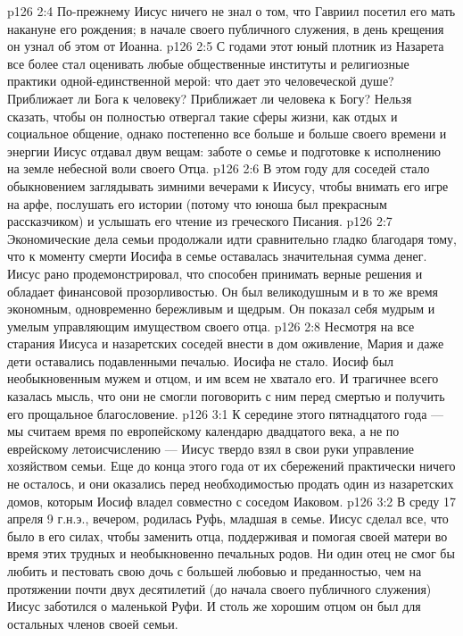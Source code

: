 \vs p126 2:4 По\hyp{}прежнему Иисус ничего не знал о том, что Гавриил посетил его мать накануне его рождения; в начале своего публичного служения, в день крещения он узнал об этом от Иоанна.
\vs p126 2:5 \pc С годами этот юный плотник из Назарета все более стал оценивать любые общественные институты и религиозные практики одной\hyp{}единственной мерой: что дает это человеческой душе? Приближает ли Бога к человеку? Приближает ли человека к Богу? Нельзя сказать, чтобы он полностью отвергал такие сферы жизни, как отдых и социальное общение, однако постепенно все больше и больше своего времени и энергии Иисус отдавал двум вещам: заботе о семье и подготовке к исполнению на земле небесной воли своего Отца.
\vs p126 2:6 \pc В этом году для соседей стало обыкновением заглядывать зимними вечерами к Иисусу, чтобы внимать его игре на арфе, послушать его истории (потому что юноша был прекрасным рассказчиком) и услышать его чтение из греческого Писания.
\vs p126 2:7 Экономические дела семьи продолжали идти сравнительно гладко благодаря тому, что к моменту смерти Иосифа в семье оставалась значительная сумма денег. Иисус рано продемонстрировал, что способен принимать верные решения и обладает финансовой прозорливостью. Он был великодушным и в то же время экономным, одновременно бережливым и щедрым. Он показал себя мудрым и умелым управляющим имуществом своего отца.
\vs p126 2:8 Несмотря на все старания Иисуса и назаретских соседей внести в дом оживление, Мария и даже дети оставались подавленными печалью. Иосифа не стало. Иосиф был необыкновенным мужем и отцом, и им всем не хватало его. И трагичнее всего казалась мысль, что они не смогли поговорить с ним перед смертью и получить его прощальное благословение.
\vs p126 3:1 К середине этого пятнадцатого года --- мы считаем время по европейскому календарю двадцатого века, а не по еврейскому летоисчислению --- Иисус твердо взял в свои руки управление хозяйством семьи. Еще до конца этого года от их сбережений практически ничего не осталось, и они оказались перед необходимостью продать один из назаретских домов, которым Иосиф владел совместно с соседом Иаковом.
\vs p126 3:2 В среду 17 апреля 9 г.н.э., вечером, родилась Руфь, младшая в семье. Иисус сделал все, что было в его силах, чтобы заменить отца, поддерживая и помогая своей матери во время этих трудных и необыкновенно печальных родов. Ни один отец не смог бы любить и пестовать свою дочь с большей любовью и преданностью, чем на протяжении почти двух десятилетий (до начала своего публичного служения) Иисус заботился о маленькой Руфи. И столь же хорошим отцом он был для остальных членов своей семьи.
